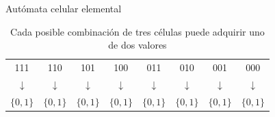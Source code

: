 \begin{frame}{Autómata celular elemental}
	\begin{table}
		
		\centering
		
		\begin{tabular}{c c c c c c c c} 
			
			111 & 110 & 101 & 100 & 011 & 010 & 001 & 000 \\
			
			$\downarrow$ & $\downarrow$ & $\downarrow$ & $\downarrow$ & $\downarrow$ & $\downarrow$ & $\downarrow$ & $\downarrow$ \\
			
			$\{ 0, 1 \}$ & $\{ 0, 1 \}$ & $\{ 0, 1 \}$ & $\{ 0, 1 \}$ & $\{ 0, 1 \}$ & $\{ 0, 1 \}$ & $\{ 0, 1 \}$ & $\{ 0, 1 \}$ 
			
		\end{tabular}
		
		\caption{Cada posible combinación de tres células puede adquirir uno de dos valores}
	\end{table}
\end{frame}

